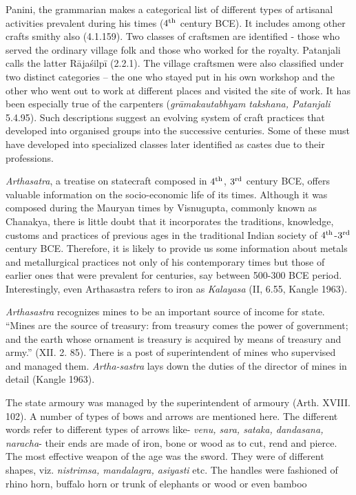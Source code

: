Panini, the grammarian makes a categorical list of different types of artisanal activities prevalent during his times ($4^{\rm th}$ century BCE). It includes among other crafts smithy also (4.1.159). Two classes of craftsmen are identified - those who served the ordinary village folk and those who worked for the royalty. Patanjali calls the latter Rājaśilpī (2.2.1). The village craftsmen were also classified under two distinct categories – the one who stayed put in his own workshop and the other who went out to work at different places and visited the site of work. It has been especially true of the carpenters ({\it grāmakautabhyam takshana, Patanjali} 5.4.95). Such descriptions suggest an evolving system of craft practices that developed into organised groups into the successive centuries. Some of these must have developed into specialized classes later identified as castes due to their professions. 

{\it Arthasatra}, a treatise on statecraft composed in $4^{\rm th}$, $3^{\rm rd}$ century BCE, offers valuable information on the socio-economic life of its times. Although it was composed during the Mauryan times by Visnugupta, commonly known as Chanakya, there is little doubt that it incorporates the traditions, knowledge, customs and practices of previous ages in the traditional Indian society of $4^{\rm th}$-$3^{\rm rd}$ century BCE. Therefore, it is likely to provide us some information about metals and metallurgical practices not only of his contemporary times but those of earlier ones that were prevalent for centuries, say between 500-300 BCE period. Interestingly, even Arthasastra refers to iron as {\it Kalayasa} (II, 6.55, Kangle 1963).

{\it Arthasastra} recognizes mines to be an important source of income for state. “Mines are the source of treasury: from treasury comes the power of government; and the earth whose ornament is treasury is acquired by means of treasury and army.” (XII. 2. 85). There is a post of superintendent of mines who supervised and managed them. {\it Artha-\newpage sastra} lays down the duties of the director of mines in detail (Kangle 1963).

The state armoury was managed by the superintendent of armoury (Arth. XVIII. 102). A number of types of bows and arrows are mentioned here. The different words refer to different types of arrows like- {\it venu, sara, sataka, dandasana, naracha}- their ends are made of iron, bone or wood as to cut, rend and pierce. The most effective weapon of the age was the sword. They were of different shapes, viz. {\it nistrimsa, mandalagra, asiyasti} etc. The handles were fashioned of rhino horn, buffalo horn or trunk of elephants or wood or even bamboo

